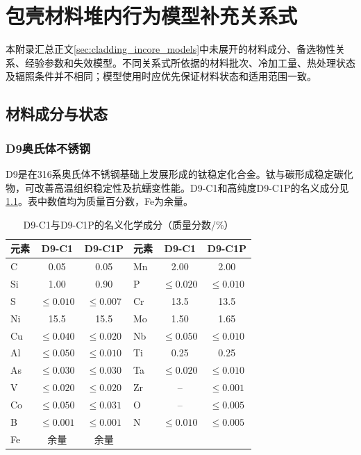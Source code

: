 \chapter{包壳材料堆内行为模型补充关系式}
\label{app:cladding_supplementary_models}



本附录汇总正文\ref{sec:cladding_incore_models}中未展开的材料成分、备选物性关系、经验参数和失效模型。不同关系式所依据的材料批次、冷加工量、热处理状态及辐照条件并不相同；模型使用时应优先保证材料状态和适用范围一致。

\section{材料成分与状态}
\label{app:cladding_material_compositions}

\subsection{D9奥氏体不锈钢}

D9是在316系奥氏体不锈钢基础上发展形成的钛稳定化合金。钛与碳形成稳定碳化物，可改善高温组织稳定性及抗蠕变性能。D9-C1和高纯度D9-C1P的名义成分见\tablename\ref{tab:appendix_d9_composition}\cite{hofmanMetallicFuelsHandbook2019}。表中数值均为质量百分数，Fe为余量。

\begin{table}[htbp]
	\centering
	\caption{D9-C1与D9-C1P的名义化学成分（质量分数/\%）}
	\label{tab:appendix_d9_composition}
	
	\begin{tabular*}{\textwidth}{
			@{\extracolsep{\fill}}
			lcc lcc
			@{}
		}
		\toprule
		元素 & D9-C1 & D9-C1P & 元素 & D9-C1 & D9-C1P \\
		\midrule
		C  & 0.05 & 0.05 & Mn & 2.00 & 2.00 \\
		Si & 1.00 & 0.90 & P  & $\leq0.020$ & $\leq0.010$ \\
		S  & $\leq0.010$ & $\leq0.007$ & Cr & 13.5 & 13.5 \\
		Ni & 15.5 & 15.5 & Mo & 1.50 & 1.65 \\
		Cu & $\leq0.040$ & $\leq0.020$ & Nb & $\leq0.050$ & $\leq0.010$ \\
		Al & $\leq0.050$ & $\leq0.010$ & Ti & 0.25 & 0.25 \\
		As & $\leq0.030$ & $\leq0.030$ & Ta & $\leq0.020$ & $\leq0.010$ \\
		V  & $\leq0.020$ & $\leq0.020$ & Zr & -- & $\leq0.001$ \\
		Co & $\leq0.050$ & $\leq0.031$ & O  & -- & $\leq0.005$ \\
		B  & $\leq0.001$ & $\leq0.001$ & N  & $\leq0.010$ & $\leq0.005$ \\
		Fe & 余量 & 余量 & & & \\
		\bottomrule
	\end{tabular*}
\end{table}

